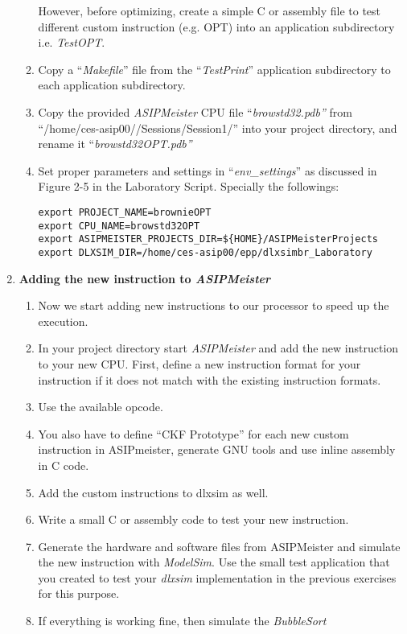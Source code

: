 \begin{enumerate}
\begin{enumerate}
		However, before optimizing, create a simple C or assembly file to
		test different custom instruction (e.g. OPT) into an application
		subdirectory i.e. \emph{TestOPT}.
		\item
		Copy a ``\emph{Makefile}'' file from the ``\emph{TestPrint}''
		application subdirectory to each application subdirectory.
		\item
		Copy the provided \emph{ASIPMeister} CPU file
		``\emph{browstd32.pdb''} from ``/home/ces-asip00//Sessions/Session1/''
		into your project directory, and rename it
		``\emph{browstd32OPT.pdb''}
		\item
		Set proper parameters and settings in ``\emph{env\_settings}'' as
		discussed in Figure 2-5 in the Laboratory Script. Specially the
		followings:
\begin{lstlisting}
export PROJECT_NAME=brownieOPT
export CPU_NAME=browstd32OPT
export ASIPMEISTER_PROJECTS_DIR=${HOME}/ASIPMeisterProjects
export DLXSIM_DIR=/home/ces-asip00/epp/dlxsimbr_Laboratory
\end{lstlisting}
	\end{enumerate}
\item \textbf{Adding the new instruction to \emph{ASIPMeister}}
	\begin{enumerate}
		\def\labelenumii{\arabic{enumii}.}
		\item
		Now we start adding new instructions to our processor to speed up
		the execution.
		\item
		In your project directory start \emph{ASIPMeister} and add the new
		instruction to your new CPU. First, define a new instruction format
		for your instruction if it does not match with the existing
		instruction formats.
		\item
		Use the available opcode.
		\item
		You also have to define ``CKF Prototype'' for each new custom instruction in ASIPmeister, generate GNU tools and use inline assembly in C code.
		\item
		Add the custom instructions to dlxsim as well.
		\item
		Write a small C or assembly code to test your new instruction.
		\item
		Generate the hardware and software files from ASIPMeister and
		simulate the new instruction with \emph{ModelSim}. Use the small
		test application that you created to test your \emph{dlxsim}
		implementation in the previous exercises for this purpose.
		\item
		If everything is working fine, then simulate the \emph{BubbleSort}

\end{enumerate}
\end{enumerate}

